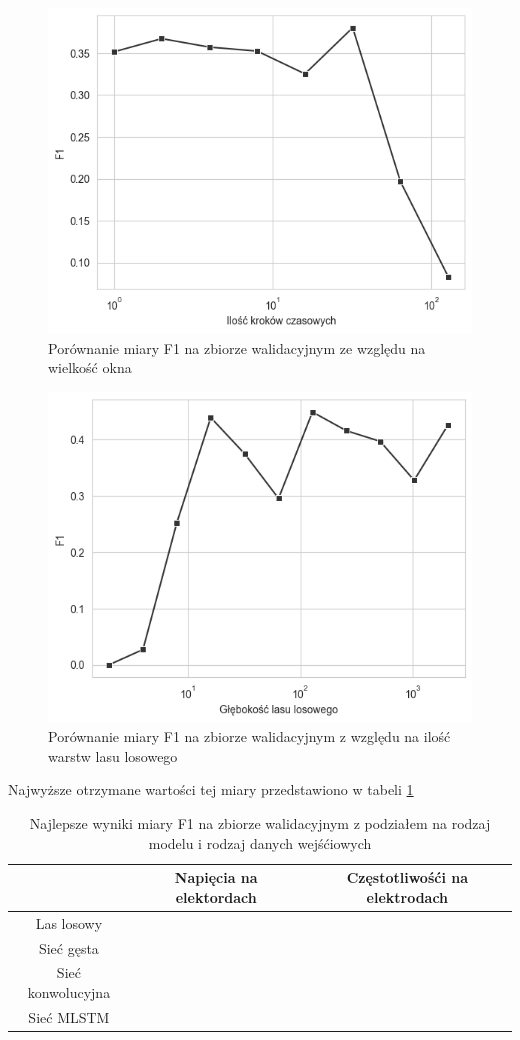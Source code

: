 \documentclass{./assets/wfis}
\begin{document}
\begin{figure}[h!]
    \centering
    \includegraphics[width=0.5\columnwidth]{thesis/assets/window_size_vs_f1.png}
    \caption{Porównanie miary F1 na zbiorze walidacyjnym ze względu na wielkość okna}
    \label{fig:window-size}
\end{figure}

\begin{figure}[h!]
    \centering
    \includegraphics[width=0.5\columnwidth]{thesis/assets/forest_depth_vs_f1.png}
    \caption{Porównanie miary F1 na zbiorze walidacyjnym z względu na ilość warstw lasu losowego}
    \label{fig:rf-num-nodes}
\end{figure}

 Najwyższe otrzymane wartości tej miary przedstawiono w tabeli \ref{tab:high-level-results}


\begin{table}[h]
    \centering
    \begin{tabular}{|c|c|c|}
        \hline
                 & Napięcia na elektordach & Częstotliwośći na elektrodach  \\
        \hline
        Las losowy &  &  \\
        Sieć gęsta &  & \\
        Sieć konwolucyjna & & \\
        Sieć MLSTM & & \\
        \hline
    \end{tabular}
    \caption{Najlepsze wyniki miary F1 na zbiorze walidacyjnym z podziałem na rodzaj modelu i rodzaj danych wejśćiowych}
    \label{tab:high-level-results}
\end{table}
\end{document}
